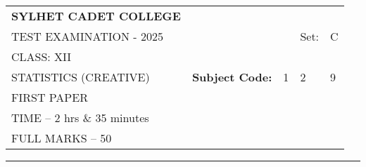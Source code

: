 \documentclass{article}
\begin{document}
\begin{table}[h]
\centering
\begin{tabular}{lllll}
\textbf{\large SYLHET CADET COLLEGE} &  &  &  &  \\ \cline{4-5} 
TEST EXAMINATION - 2025 &  & \multicolumn{1}{l|}{} & \multicolumn{1}{l|}{Set:} & \multicolumn{1}{l|}{C} \\ \cline{4-5} 
CLASS: XII &  &  &  &  \\ \cline{3-5} 
STATISTICS (CREATIVE)& \multicolumn{1}{l|}{\textbf{Subject Code:}} & \multicolumn{1}{l|}{1} & \multicolumn{1}{l|}{2} & \multicolumn{1}{l|}{9} \\ \cline{3-5} 
 FIRST PAPER &  &  &  &  \\
TIME – 2 hrs \& 35 minutes &  &  &  &  \\
FULL MARKS – 50 &  &  &  & 
\end{tabular}
\end{table}

\hrule
\end{document}
